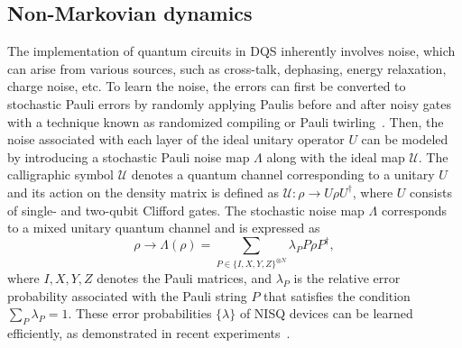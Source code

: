 \documentclass[10pt, superscriptaddress,aps,pra,twocolumn,showpacs,nofootinbib, longbibliography, notitlepage,floatfix]{revtex4-2}
\begin{document}
\subsection*{Non-Markovian dynamics}
The implementation of quantum circuits in DQS inherently involves noise, which can arise from various sources, such as cross-talk, dephasing, energy relaxation, charge noise, etc. To learn the noise, the errors can first be converted to stochastic Pauli errors by randomly applying Paulis before and after noisy gates with a technique known as randomized compiling or Pauli twirling~\cite{EmersonPRA2016, EmersonPRX2021}. Then, the noise associated with each layer of the ideal unitary operator $U$ can be modeled by introducing a stochastic Pauli noise map $\Lambda$ along with the ideal map $\mathcal{U}$. The calligraphic symbol $\mathcal{U}$ denotes a quantum channel corresponding to a unitary $U$ and its action on the density matrix is defined as $\mathcal{U}: \rho \rightarrow U \rho U^{\dagger}$, where $U$ consists of single- and two-qubit Clifford gates. The stochastic noise map $\Lambda$ corresponds to a mixed unitary quantum channel and is expressed as 
\begin{equation}
    \rho \rightarrow \Lambda(\rho) = \sum_{P \in \{I,X,Y,Z\}^{\otimes N}} \lambda_P P \rho P^{\dagger},\label{gen_pauli_channel}
\end{equation}
where $I, X, Y, Z$ denotes the Pauli matrices, and $\lambda_P$ is the relative error probability associated with the Pauli string $P$ that satisfies the condition $\sum_P \lambda_P = 1$. These error probabilities $\{ \lambda \}$ of NISQ devices can be learned efficiently, as demonstrated in recent experiments~\cite{Blatt_nat_comm_2019, vandenBerg2023_natphys, Kim2023, fischer2024dynamicalsimulationsmanybodyquantum}.
\end{document}
